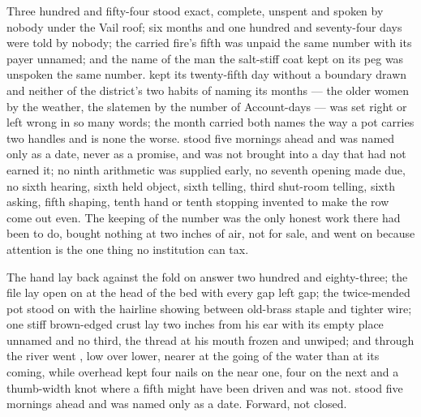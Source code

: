 Three hundred and fifty-four stood exact, complete, unspent and spoken by nobody under the Vail roof; six months and one hundred and seventy-four days were told by nobody; the carried fire's fifth was unpaid the same number with its payer unnamed; and the name of the man the salt-stiff coat kept on its peg was unspoken the same number.  kept its twenty-fifth day without a boundary drawn and neither of the district's two habits of naming its months --- the older women by the weather, the slatemen by the number of Account-days --- was set right or left wrong in so many words; the month carried both names the way a pot carries two handles and is none the worse.  stood five mornings ahead and was named only as a date, never as a promise, and was not brought into a day that had not earned it; no ninth arithmetic was supplied early, no seventh opening made due, no sixth hearing, sixth held object, sixth telling, third shut-room telling, sixth asking, fifth shaping, tenth hand or tenth stopping invented to make the row come out even. The keeping of the number was the only honest work there had been to do, bought nothing at two inches of air, not for sale, and went on because attention is the one thing no institution can tax.

The hand lay back against the fold on answer two hundred and eighty-three; the file lay open on  at the head of the bed with every gap left gap; the twice-mended pot stood on  with the hairline showing between old-brass staple and tighter wire; one stiff brown-edged crust lay two inches from his ear with its empty place unnamed and no third, the thread at his mouth frozen and unwiped; and through  the river went , low over lower, nearer at the going of the water than at its coming, while  overhead kept four nails on the near one, four on the next and a thumb-width knot where a fifth might have been driven and was not.  stood five mornings ahead and was named only as a date. Forward, not closed.
